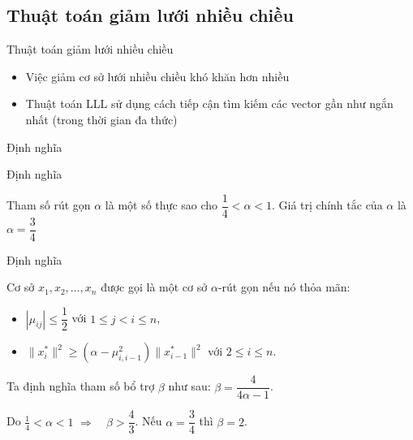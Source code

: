 \documentclass{beamer}
\numberwithin{equation}{section}
\begin{document}
\subsection{Thuật toán giảm lưới nhiều chiều}
\begin{frame}{Thuật toán giảm lưới nhiều chiều}
\begin{itemize}
\item Việc giảm cơ sở lưới nhiều chiều khó khăn hơn nhiều
\item Thuật toán LLL sử dụng cách tiếp cận tìm kiếm các vector gần như ngắn nhất (trong thời gian đa thức)
\end{itemize}
\end{frame}
\begin{frame}{Định nghĩa}

\begin{block}{Định nghĩa}

Tham số rút gọn $\alpha$ là một số thực sao cho $\dfrac{1}{4} < \alpha < 1$.
Giá trị chính tắc của $\alpha$ là $\alpha = \dfrac{3}{4}$

\end{block}

\begin{block}{Định nghĩa}

Cơ sở $x_1, x_2, \dots, x_n$ được gọi là một cơ sở $\alpha$-rút gọn nếu nó thỏa mãn:

\begin{itemize}
\item $|\mu_{ij}| \leq \dfrac{1}{2} $ với $1 \leq j < i \leq n$,
\item $\|x_i^*\|^2 \geq (\alpha - \mu_{i, i-1}^2)\|x_{i-1}^*\|^2$ với $2\leq i \leq n$.
\end{itemize}

\end{block}

Ta định nghĩa tham số bổ trợ $\beta$ như sau: \quad $\beta = \dfrac{4}{4\alpha - 1}$.

Do \quad $\frac{1}{4} < \alpha < 1$ \quad $\Rightarrow \quad \beta > \dfrac{4}{3}$. \quad Nếu $\alpha = \dfrac{3}{4}$ thì $\beta = 2$.

\end{frame}
\end{document}
